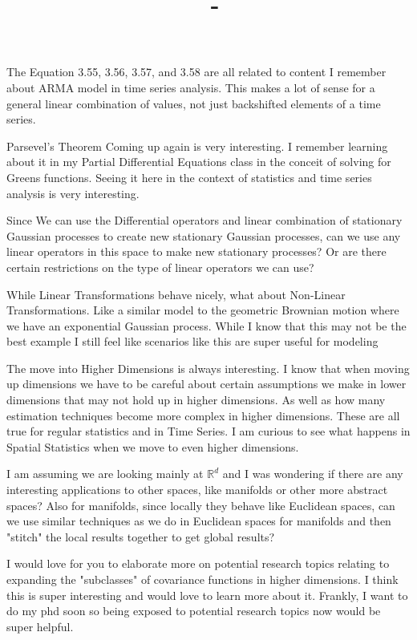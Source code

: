 \documentclass[answers,12pt,addpoints]{exam}
\author{\name}
\title{\course \ - \assignment}
\begin{document}
\maketitle


\begin{questions}
\question The Equation 3.55, 3.56, 3.57, and 3.58 are all related to content I remember about ARMA model in time series analysis. This makes a lot of sense for a general linear combination of values, not just backshifted elements of a time series.

\question Parsevel's Theorem Coming up again is very interesting. I remember learning about it in my Partial Differential Equations class in the conceit of solving for Greens functions. Seeing it here in the context of statistics and time series analysis is very interesting.
    
\question Since We can use the Differential operators and linear combination of stationary Gaussian processes to create new stationary Gaussian processes, can we use any linear operators in this space to make new stationary processes? Or are there certain restrictions on the type of linear operators we can use?

\question While Linear Transformations behave nicely, what about Non-Linear Transformations. Like a similar model to the geometric Brownian motion where we have an exponential Gaussian process. While I know that this may not be the best example I still feel like scenarios like this are super useful for modeling

\question The move into Higher Dimensions is always interesting. I know that when moving up dimensions we have to be careful about certain assumptions we make in lower dimensions that may not hold up in higher dimensions. As well as how many estimation techniques become more complex in higher dimensions. These are all true for regular statistics and in Time Series. I am curious to see what happens in Spatial Statistics when we move to even higher dimensions.

\question I am assuming we are looking mainly at $\mathbb{R}^d$ and I was wondering if there are any interesting applications to other spaces, like manifolds or other more abstract spaces? Also for manifolds, since locally they behave like Euclidean spaces, can we use similar techniques as we do in Euclidean spaces for manifolds and then "stitch" the local results together to get global results?

\question I would love for you to elaborate more on potential research topics relating to expanding the "subclasses" of covariance functions in higher dimensions. I think this is super interesting and would love to learn more about it. Frankly, I want to do my phd soon so being exposed to potential research topics now would be super helpful.


\end{questions}
\end{document}
